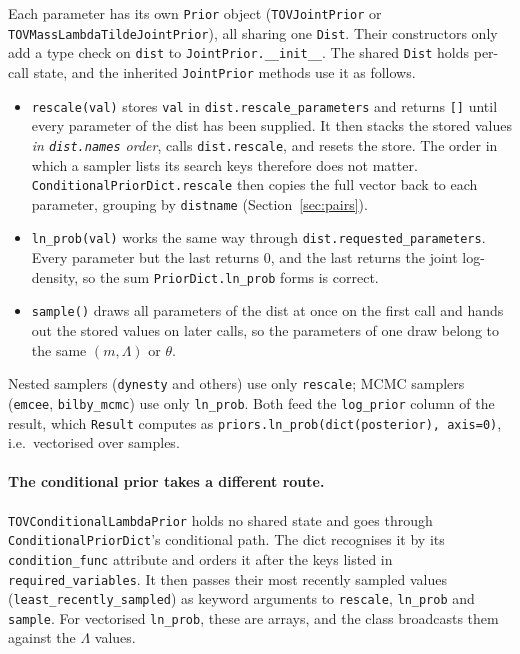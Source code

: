 \documentclass[11pt,a4paper]{article}
\newcommand{\code}[1]{\texttt{#1}}
\begin{document}
Each parameter has its own \code{Prior} object (\code{TOVJointPrior} or
\code{TOVMassLambdaTildeJointPrior}), all sharing one \code{Dist}. Their
constructors only add a type check on \code{dist} to
\code{JointPrior.\_\_init\_\_}. The shared \code{Dist} holds per-call state,
and the inherited \code{JointPrior} methods use it as follows.
\begin{itemize}
  \item \code{rescale(val)} stores \code{val} in \code{dist.rescale\_parameters}
    and returns \code{[]} until every parameter of the dist has been
    supplied. It then stacks the stored values \emph{in \code{dist.names}
    order}, calls \code{dist.rescale}, and resets the store. The order in
    which a sampler lists its search keys therefore does not matter.
    \code{ConditionalPriorDict.rescale} then copies the full vector back to
    each parameter, grouping by \code{distname} (Section~\ref{sec:pairs}).
  \item \code{ln\_prob(val)} works the same way through
    \code{dist.requested\_parameters}. Every parameter but the last returns $0$,
    and the last returns the joint log-density, so the sum
    \code{PriorDict.ln\_prob} forms is correct.
  \item \code{sample()} draws all parameters of the dist at once on the first
    call and hands out the stored values on later calls, so the parameters of
    one draw belong to the same $(m, \Lambda)$ or $\theta$.
\end{itemize}
Nested samplers (\code{dynesty} and others) use only \code{rescale}; MCMC samplers
(\code{emcee}, \code{bilby\_mcmc}) use only \code{ln\_prob}. Both feed the
\code{log\_prior} column of the result, which \code{Result} computes as
\code{priors.ln\_prob(dict(posterior), axis=0)}, i.e.\ vectorised over samples.

\paragraph{The conditional prior takes a different route.}
\code{TOVConditionalLambdaPrior} holds no shared state and goes through
\code{ConditionalPriorDict}'s conditional path. The dict recognises it by its
\code{condition\_func} attribute and orders it after the keys listed in
\code{required\_variables}. It then passes their most recently sampled values
(\code{least\_recently\_sampled}) as keyword arguments to \code{rescale},
\code{ln\_prob} and \code{sample}. For vectorised \code{ln\_prob}, these are
arrays, and the class broadcasts them against the $\Lambda$ values.
\end{document}

